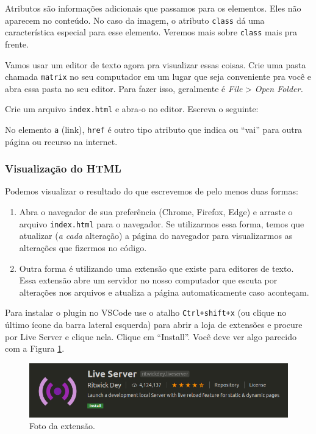 \documentclass{article}
\begin{document}
Atributos são informações adicionais que passamos para os elementos.
Eles não aparecem no conteúdo. No caso da imagem, o atributo
\texttt{class} dá uma característica especial para esse elemento.
Veremos mais sobre \texttt{class} mais pra frente.


Vamos usar um editor de texto agora pra visualizar essas coisas. Crie
uma pasta chamada \texttt{matrix} no seu computador em um lugar que seja
conveniente pra você e abra essa pasta no seu editor. Para fazer isso,
geralmente é \emph{File} \textgreater{} \emph{Open Folder.}

Crie um arquivo \texttt{index.html} e abra-o no editor. Escreva o
seguinte:


No elemento \texttt{a} (link), \texttt{href} é outro tipo atributo que
indica ou ``vai'' para outra página ou recurso na internet.


\subsubsection{Visualização do HTML}
Podemos visualizar o resultado do que escrevemos de pelo menos duas
formas:

\begin{enumerate}
\item
  Abra o navegador de sua preferência (Chrome, Firefox, Edge) e arraste
  o arquivo \texttt{index.html} para o navegador. Se utilizarmos essa
  forma, temos que atualizar (\emph{a cada} alteração) a página do
  navegador para visualizarmos as alterações que fizermos no código.
\item
  Outra forma é utilizando uma extensão que existe para editores de
  texto. Essa extensão abre um servidor no nosso computador que escuta
  por alterações nos arquivos e atualiza a página automaticamente caso
  aconteçam.
\end{enumerate}

Para instalar o plugin no VSCode use o atalho \texttt{Ctrl+shift+x} (ou
clique no último ícone da barra lateral esquerda) para abrir a loja de
extensões e procure por Live Server e clique nela. Clique em ``Install''.
Você deve ver algo parecido com a Figura \ref{fig:live-server-ext}.

\begin{figure}[h!]
    \centering
    \includegraphics[scale=.5]{imgs/live-server-extension.png}
    \caption{Foto da extensão.}
    \label{fig:live-server-ext}
\end{figure}
\end{document}
